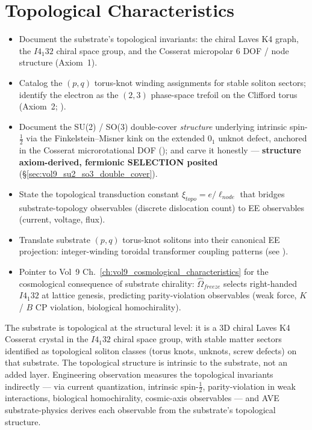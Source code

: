 \chapter{Topological Characteristics}
\label{ch:vol9_topological_characteristics}

\begin{objectivebox}
\begin{itemize}
    \item Document the substrate's topological invariants: the chiral Laves K4 graph, the $I4_1 32$ chiral space group, and the Cosserat micropolar 6 DOF / node structure (Axiom~1).
    \item Catalog the $(p, q)$ torus-knot winding assignments for stable soliton sectors; identify the electron as the $(2, 3)$ phase-space trefoil on the Clifford torus (Axiom~2; ).
    \item Document the SU(2) / SO(3) double-cover \emph{structure} underlying intrinsic spin-$\tfrac{1}{2}$ via the Finkelstein--Misner kink on the extended $0_1$ unknot defect, anchored in the Cosserat microrotational DOF (); and carve it honestly --- \textbf{structure axiom-derived, fermionic SELECTION posited} (\S\ref{sec:vol9_su2_so3_double_cover}).
    \item State the topological transduction constant $\xi_{topo} = e/\ell_{node}$ that bridges substrate-topology observables (discrete dislocation count) to EE observables (current, voltage, flux).
    \item Translate substrate $(p, q)$ torus-knot solitons into their canonical EE projection: integer-winding toroidal transformer coupling patterns (see ).
    \item Pointer to Vol~9 Ch.~\ref{ch:vol9_cosmological_characteristics} for the cosmological consequence of substrate chirality: $\hat{\Omega}_{freeze}$ selects right-handed $I4_1 32$ at lattice genesis, predicting parity-violation observables (weak force, $K$ / $B$ CP violation, biological homochirality).
\end{itemize}
\end{objectivebox}

The substrate is topological at the structural level: it is a 3D chiral Laves K4 Cosserat crystal in the $I4_1 32$ chiral space group, with stable matter sectors identified as topological soliton classes (torus knots, unknots, screw defects) on that substrate. The topological structure is intrinsic to the substrate, not an added layer. Engineering observation measures the topological invariants indirectly --- via current quantization, intrinsic spin-$\tfrac{1}{2}$, parity-violation in weak interactions, biological homochirality, cosmic-axis observables --- and AVE substrate-physics derives each observable from the substrate's topological structure.

